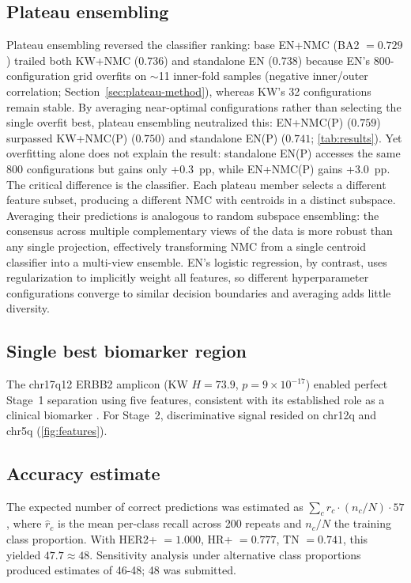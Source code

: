 \documentclass[11pt,a4paper,twocolumn]{article}
\begin{document}
\subsection{Plateau ensembling}
\label{sec:plateau}

Plateau ensembling reversed the classifier ranking: base EN+NMC (BA2 $= 0.729$) trailed both KW+NMC ($0.736$) and standalone EN ($0.738$) because EN's 800-configuration grid overfits on $\sim$11 inner-fold samples (negative inner/outer correlation; Section~\ref{sec:plateau-method}), whereas KW's 32 configurations remain stable. By averaging near-optimal configurations rather than selecting the single overfit best, plateau ensembling neutralized this: EN+NMC(P) ($0.759$) surpassed KW+NMC(P) ($0.750$) and standalone EN(P) ($0.741$; \autoref{tab:results}). Yet overfitting alone does not explain the result: standalone EN(P) accesses the same 800 configurations but gains only +0.3~pp, while EN+NMC(P) gains +3.0~pp. The critical difference is the classifier. Each plateau member selects a different feature subset, producing a different NMC with centroids in a distinct subspace. Averaging their predictions is analogous to random subspace ensembling: the consensus across multiple complementary views of the data is more robust than any single projection, effectively transforming NMC from a single centroid classifier into a multi-view ensemble. EN's logistic regression, by contrast, uses regularization to implicitly weight all features, so different hyperparameter configurations converge to similar decision boundaries and averaging adds little diversity.

\subsection{Single best biomarker region}
\label{sec:biomarker}

The chr17q12 ERBB2 amplicon (KW $H = 73.9$, $p = 9 \times 10^{-17}$) enabled perfect Stage~1 separation using five features, consistent with its established role as a clinical biomarker \citep{slamon1987her2}. For Stage~2, discriminative signal resided on chr12q and chr5q (\autoref{fig:features}).

\subsection{Accuracy estimate}
\label{sec:estimate}

The expected number of correct predictions was estimated as $\sum_c \hat{r}_c \cdot (n_c/N) \cdot 57$, where $\hat{r}_c$ is the mean per-class recall across 200 repeats and $n_c/N$ the training class proportion. With HER2+ $= 1.000$, HR+ $= 0.777$, TN $= 0.741$, this yielded $47.7 \approx 48$. Sensitivity analysis under alternative class proportions produced estimates of 46-48; 48 was submitted.
\end{document}

